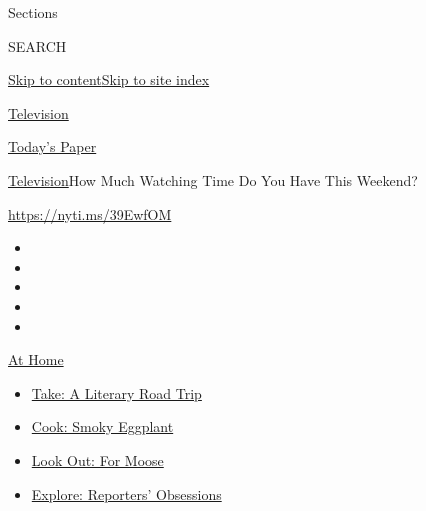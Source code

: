 Sections

SEARCH

\protect\hyperlink{site-content}{Skip to
content}\protect\hyperlink{site-index}{Skip to site index}

\href{https://www.nytimes3xbfgragh.onion/section/arts/television}{Television}

\href{https://myaccount.nytimes3xbfgragh.onion/auth/login?response_type=cookie\&client_id=vi}{}

\href{https://www.nytimes3xbfgragh.onion/section/todayspaper}{Today's
Paper}

\href{/section/arts/television}{Television}\textbar{}How Much Watching
Time Do You Have This Weekend?

\url{https://nyti.ms/39EwfOM}

\begin{itemize}
\item
\item
\item
\item
\item
\end{itemize}

\href{https://www.nytimes3xbfgragh.onion/spotlight/at-home?action=click\&pgtype=Article\&state=default\&region=TOP_BANNER\&context=at_home_menu}{At
Home}

\begin{itemize}
\tightlist
\item
  \href{https://www.nytimes3xbfgragh.onion/2020/07/28/books/time-for-a-literary-road-trip.html?action=click\&pgtype=Article\&state=default\&region=TOP_BANNER\&context=at_home_menu}{Take:
  A Literary Road Trip}
\item
  \href{https://www.nytimes3xbfgragh.onion/2020/07/29/magazine/bored-with-your-home-cooking-some-smoky-eggplant-will-fix-that.html?action=click\&pgtype=Article\&state=default\&region=TOP_BANNER\&context=at_home_menu}{Cook:
  Smoky Eggplant}
\item
  \href{https://www.nytimes3xbfgragh.onion/2020/07/27/travel/moose-michigan-isle-royale.html?action=click\&pgtype=Article\&state=default\&region=TOP_BANNER\&context=at_home_menu}{Look
  Out: For Moose}
\item
  \href{https://www.nytimes3xbfgragh.onion/interactive/2020/at-home/even-more-reporters-editors-diaries-lists-recommendations.html?action=click\&pgtype=Article\&state=default\&region=TOP_BANNER\&context=at_home_menu}{Explore:
  Reporters' Obsessions}
\end{itemize}


